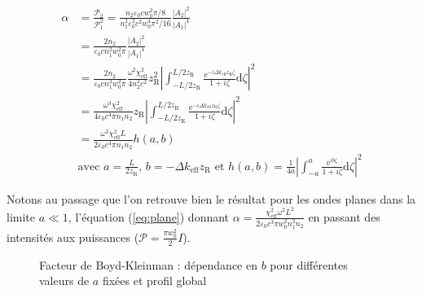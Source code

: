 \documentclass[11pt,a4paper] { article}
\newcommand{\zr}{z_\mathsc{R}}
\newcommand{\chie}{\chi_\mathsc{eff}}
\renewcommand{\P}{\mathscr{P}}
\newcommand{\e}[1]{\text{e}^{#1}}
\newcommand{\mathsc}[1]{\mathrm{\scriptscriptstyle {#1}}}
\begin{document}
\begin{align} 
	\alpha &= \frac{\P_2}{\P_1^2} = \frac{n_2 \varepsilon_0 c w_0^2 \pi/8}{n_1^2 \varepsilon_0^2 c^2 w_0^4 \pi^2/16} \frac{|A_2|^2}{|A_1|^4} \nonumber \\
	&= \frac{2n_2}{\varepsilon_0 c n_1^2 w_0^2 \pi} \frac{|A_2|^2}{|A_1|^4} \nonumber  \\
	&= \frac{2n_2}{\varepsilon_0 c n_1^2 w_0^2 \pi} \frac{\omega^2\chi_\mathsc{eff}^2}{4 n_2^2 c^2} \zr^2 
	\left| \int_{-L/2\zr}^{L/2\zr} \frac{\e{-i\Delta k_\mathsc{eff} \zr \zeta}}{1+i\zeta} \mathrm d\zeta \right|^2 \nonumber \\
	&= \frac{\omega^3 \chie^2}{4 \varepsilon_0 c^4 \pi n_1 n_2} \zr 
	\left| \int_{-L/2\zr}^{L/2\zr} \frac{\e{-i\Delta k_\mathsc{eff} \zr \zeta}}{1+i\zeta} \mathrm d\zeta \right|^2 \nonumber \\
	&= \boxed{ \frac{\omega^3 \chie^2 L}{2 \varepsilon_0 c^4 \pi n_1 n_2} h(a,b) } \\
	&\text{avec } \boxed{ a=\frac{L}{2z_{\mathsc R}}\text{, } b=- \Delta k_\mathsc{eff} z_{\mathsc R}
	\text{ et } h(a,b)=\frac{1}{4a} \left|\int_{-a}^{a} \frac{\e{ib\zeta}}{1+i\zeta} \mathrm d\zeta \right|^2 } \nonumber 
\end{align}


Notons au passage que l'on retrouve bien le résultat pour les ondes planes dans la limite $a\ll1$, l'équation (\ref{eq:plane}) donnant $\alpha = \frac{\chie^2 \omega^2 L^2}{2 \varepsilon_0 c^3 \pi w_0^2 n_1^2 n_2}$ en passant des intensités aux puissances ($\P = \frac{\pi w_0^2}{2} I$). 


\begin{figure}[htpb] 
\centering
\hspace*{-0.8cm}
\begin{subfigure}[b]{0.48\textwidth}
	\small
	
\end{subfigure}
\hspace{0.2cm}
\begin{subfigure}[b]{0.48\textwidth}
	\small
	
\end{subfigure}
\hspace{0.8cm}
\caption{Facteur de Boyd-Kleinman : \small dépendance en $b$ pour différentes valeurs de $a$ fixées et profil global}
\label{fig:bk-factor}
\end{figure}
\end{document}
